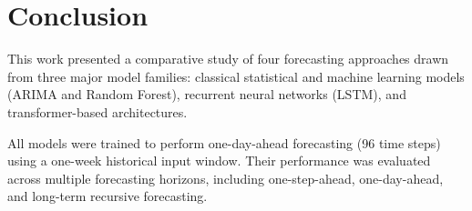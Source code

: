 

\newpage
\section*{Conclusion}

This work presented a comparative study of four forecasting approaches drawn from three major model families: classical statistical and machine learning models (ARIMA and Random Forest), recurrent neural networks (LSTM), and transformer-based architectures.

\par
All models were trained to perform one-day-ahead forecasting (96 time steps) using a one-week historical input window. Their performance was evaluated across multiple forecasting horizons, including one-step-ahead, one-day-ahead, and long-term recursive forecasting.

